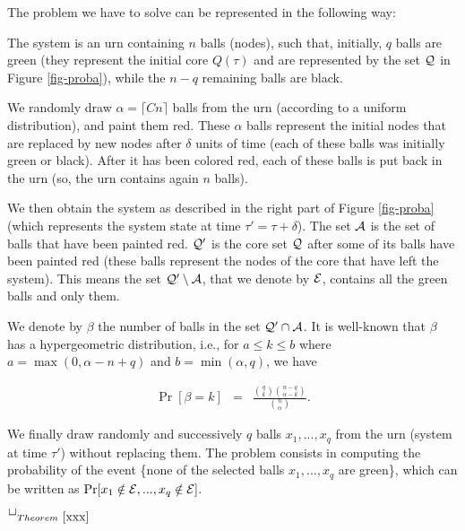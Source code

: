 \documentclass[]{llncs}
\newcommand{\toto}{xxx}
\newenvironment{proofT}{\noindent{\bf
Proof }} {\hspace*{\fill}$\Box_{Theorem~\ref{\toto}}$\par\vspace{3mm}}
\begin{document}
\begin{proofT}
The problem we have to solve can be represented in the following way:


	The system is an urn containing  $n$  balls (nodes), such that, 
	initially, $q$ balls are green (they represent the initial core $Q(\tau)$
	and are represented by the set $\cal Q$ in Figure \ref{fig-proba}),  
	while the $n-q$ remaining balls are black. 
	 
	We randomly draw $\alpha=\lceil Cn \rceil$ balls from the urn (according to a uniform 
	distribution), and paint them  red. These $\alpha$ balls represent the 
	initial nodes that are replaced by new nodes after $\delta$  units of time 
	(each of these balls was  initially  green or black). 
	After it has been  colored red, each of these balls is put back 
	in the urn (so, the urn contains again $n$ balls).  
	
	We then obtain the system as described in the right part of Figure
	\ref{fig-proba}    (which   represents   the    system   state    at   time
	$\tau'=\tau+\delta$).  The set $\cal A$ is
	the set of balls that have been painted red.  $\cal Q'$ is the
	core set $\cal Q$ after  some of its balls have been painted  red
	(these  balls  represent the nodes  of the core  that have  left  the
	system). 
	This means the set ${\cal Q}' \setminus {\cal A}$, that we denote by ${\cal E}$, 
	contains all the green balls and only them.
	
	We denote by $\beta$ the number of balls in the set ${\cal Q'} \cap {\cal A}$.
	It is well-known that $\beta$ has a hypergeometric distribution, i.e., 
	for $a\leq k\leq b$ where $a=\max(0,\alpha-n+q)$ and $b=\min(\alpha,q)$,
	we have

	\begin{eqnarray}
	\Pr[\beta=k] &=& \frac{\displaystyle{{q \choose k}{n-q \choose \alpha-k}}}{\displaystyle{{n \choose \alpha}}}. \label{eq:hyperg}
	\end{eqnarray}

	We finally draw randomly and successively $q$ balls $x_1, ..., x_q$ from the urn (system at time $\tau'$)
	without replacing them.
	The problem consists in computing the probability of the event
	\{none of the selected balls $x_1, ..., x_q$ are green\}, which can be written as 
	$\Pr[x_1\notin {\cal E}, ..., x_q\notin {\cal E}]$. 



\end{proofT}
\end{document}
